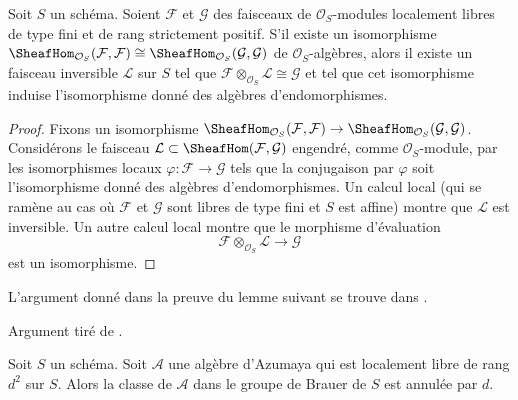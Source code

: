 \begin{lemma}
\label{lemma-end-unique-up-to-invertible}
Soit $S$ un sch\'ema. Soient $\mathcal{F}$ et $\mathcal{G}$ des faisceaux de
$\mathcal{O}_S$-modules localement libres de type fini et de rang strictement positif. S'il
existe un isomorphisme
$\SheafHom_{\mathcal{O}_S}(\mathcal{F}, \mathcal{F}) \cong
\SheafHom_{\mathcal{O}_S}(\mathcal{G}, \mathcal{G})$
de $\mathcal{O}_S$-alg\`ebres, alors il existe un faisceau inversible
$\mathcal{L}$ sur $S$ tel que
$\mathcal{F} \otimes_{\mathcal{O}_S} \mathcal{L} \cong \mathcal{G}$
et tel que cet isomorphisme induise l'isomorphisme donn\'e des
alg\`ebres d'endomorphismes.
\end{lemma}

\begin{proof}
Fixons un isomorphisme
$\SheafHom_{\mathcal{O}_S}(\mathcal{F}, \mathcal{F}) \to
\SheafHom_{\mathcal{O}_S}(\mathcal{G}, \mathcal{G})$.
Consid\'erons le faisceau $\mathcal{L} \subset \SheafHom(\mathcal{F}, \mathcal{G})$
engendr\'e, comme $\mathcal{O}_S$-module, par les isomorphismes locaux
$\varphi : \mathcal{F} \to \mathcal{G}$ tels que la conjugaison par
$\varphi$ soit l'isomorphisme donn\'e des alg\`ebres d'endomorphismes.
Un calcul local (qui se ram\`ene au cas o\`u $\mathcal{F}$ et $\mathcal{G}$
sont libres de type fini et $S$ est affine) montre que $\mathcal{L}$ est inversible.
Un autre calcul local montre que le morphisme d'\'evaluation
$$
\mathcal{F} \otimes_{\mathcal{O}_S} \mathcal{L} \longrightarrow \mathcal{G}
$$
est un isomorphisme.
\end{proof}

\noindent
L'argument donn\'e dans la preuve du lemme suivant se trouve dans
\cite{Saltman-torsion}.

\begin{lemma}
\label{lemma-annihilated-by-degree}
\begin{reference}
Argument tir\'e de \cite{Saltman-torsion}.
\end{reference}
Soit $S$ un sch\'ema. Soit $\mathcal{A}$ une alg\`ebre d'Azumaya qui est
localement libre de rang $d^2$ sur $S$. Alors la classe
de $\mathcal{A}$ dans le groupe de Brauer de $S$ est annul\'ee par $d$.
\end{lemma}

